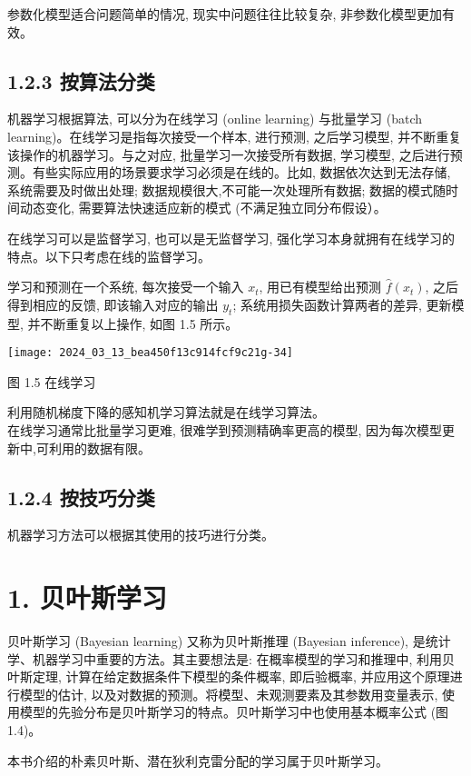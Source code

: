 \documentclass[10pt]{article}
\begin{document}
\begin{CJK*}{UTF8}{bsmi}
参数化模型适合问题简单的情况, 现实中问题往往比较复杂, 非参数化模型更加有效。

\subsection*{1.2.3 按算法分类}
机器学习根据算法, 可以分为在线学习 (online learning) 与批量学习 (batch learning)。在线学习是指每次接受一个样本, 进行预测, 之后学习模型, 并不断重复该操作的机器学习。与之对应, 批量学习一次接受所有数据, 学习模型, 之后进行预测。有些实际应用的场景要求学习必须是在线的。比如, 数据依次达到无法存储, 系统需要及时做出处理; 数据规模很大,不可能一次处理所有数据; 数据的模式随时间动态变化, 需要算法快速适应新的模式 (不满足独立同分布假设）。

在线学习可以是监督学习, 也可以是无监督学习, 强化学习本身就拥有在线学习的特点。以下只考虑在线的监督学习。

学习和预测在一个系统, 每次接受一个输入 $x_{t}$, 用已有模型给出预测 $\hat{f}\left(x_{t}\right)$, 之后得到相应的反馈, 即该输入对应的输出 $y_{t}$; 系统用损失函数计算两者的差异, 更新模型, 并不断重复以上操作, 如图 1.5 所示。

\begin{center}
\texttt{[image: 2024\_03\_13\_bea450f13c914fcf9c21g-34]}
\end{center}

图 1.5 在线学习

利用随机梯度下降的感知机学习算法就是在线学习算法。\\
在线学习通常比批量学习更难, 很难学到预测精确率更高的模型, 因为每次模型更新中,可利用的数据有限。

\subsection*{1.2.4 按技巧分类}
机器学习方法可以根据其使用的技巧进行分类。

\section*{1. 贝叶斯学习}
贝叶斯学习 (Bayesian learning) 又称为贝叶斯推理 (Bayesian inference), 是统计学、机器学习中重要的方法。其主要想法是: 在概率模型的学习和推理中, 利用贝叶斯定理, 计算在给定数据条件下模型的条件概率, 即后验概率, 并应用这个原理进行模型的估计, 以及对数据的预测。将模型、未观测要素及其参数用变量表示, 使用模型的先验分布是贝叶斯学习的特点。贝叶斯学习中也使用基本概率公式 (图 1.4)。

本书介绍的朴素贝叶斯、潜在狄利克雷分配的学习属于贝叶斯学习。


\end{CJK*}
\end{document}
